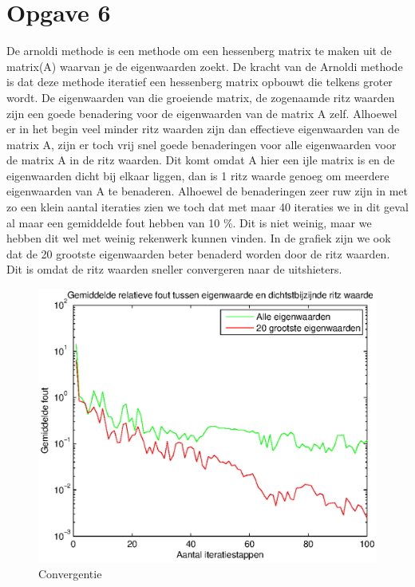 \documentclass[]{article}
\newcommand{\opgave}[1]{\section*{Opgave #1}}
\begin{document}
\opgave6


De arnoldi methode is een methode om een hessenberg matrix te maken uit de matrix(A) waarvan je de eigenwaarden zoekt. De kracht van de Arnoldi methode is dat deze methode iteratief een hessenberg matrix opbouwt die telkens groter wordt. De eigenwaarden van die groeiende matrix, de zogenaamde ritz waarden zijn een goede benadering voor de eigenwaarden van de matrix A zelf. Alhoewel er in het begin veel minder ritz waarden zijn dan effectieve eigenwaarden van de matrix A, zijn er toch vrij snel goede benaderingen voor alle eigenwaarden voor de matrix A in de ritz waarden. Dit komt omdat A hier een ijle matrix is en de eigenwaarden dicht bij elkaar liggen, dan is 1 ritz waarde genoeg om meerdere eigenwaarden van A te benaderen. Alhoewel de benaderingen zeer ruw zijn in met zo een klein aantal iteraties zien we toch dat met maar 40 iteraties we in dit geval al maar een gemiddelde fout hebben van 10 $\%$. Dit is niet weinig, maar we hebben dit wel met weinig rekenwerk kunnen vinden. In de grafiek zijn we ook dat de 20 grootste eigenwaarden beter benaderd worden door de ritz waarden. Dit is omdat de ritz waarden sneller convergeren naar de uitshieters. 

\begin{figure}[b]
\noindent \includegraphics[width=1\linewidth]{Opgave6.eps}
\caption{Convergentie}
\label{figuurtje}
\end{figure}
\end{document}
